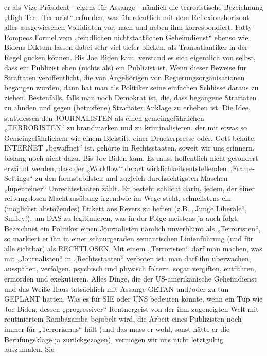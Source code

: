 \begin{multicols}{2}
{er als Vize-Präsident - eigens für Assange - nämlich die
terroristische Bezeichnung „High-Tech-Terrorist“ erfunden, was überdeutlich mit dem Reflexionshorizont aller
ausgewiesenen Vollidioten vor, nach und neben ihm
korrespondiert.\textCR
Fatty Pompeos Formel vom „feindlichen nichtstaatlichen Geheimdienst“ ebenso wie Bidens Diktum lassen
dabei sehr viel tiefer blicken, als Transatlantiker in der
Regel gucken können. Bis Joe Biden kam, verstand es
sich eigentlich von selbst, dass ein Publizist eben (nichts
als) ein Publizist ist. Wenn dieser Beweise für Straftaten
veröffentlicht, die von Angehörigen von Regierungsorganisationen begangen wurden, dann hat man als Politiker
seine einfachen Schlüsse daraus zu ziehen. Bestenfalls,
falls man noch Demokrat ist, die, dass begangene Straftaten zu ahnden und gegen (betroffene) Straftäter Anklage zu erheben ist. Die Idee, stattdessen den JOURNALISTEN als einen gemeingefährlichen „TERRORISTEN“
zu brandmarken und zu kriminalisieren, der mit etwas
so Gemeingefährlichem wie einem Bleistift, einer Druckerpresse oder, Gott behüte, INTERNET „bewaffnet“
ist, gehörte in Rechtsstaaten, soweit wir uns erinnern,
bislang noch nicht dazu. Bis Joe Biden kam.\textCR
Es muss hoffentlich nicht gesondert erwähnt werden,
dass der „Workflow“ derart wirklichkeitsentstellenden
„Frame-Settings“ zu den formstabilsten und zugleich
durchsichtigsten Maschen „lupenreiner“ Unrechtsstaaten zählt. Er besteht schlicht darin, jedem, der einer reibungslosen Machtausübung irgendwie im Wege steht,
schnellstens ein (möglichst abstoßendes) Etikett ans Revers zu heften (z.B. „Junge Liberale“, Smiley!), um DAS
zu legitimieren, was in der Folge meistens ja auch folgt.
Bezeichnet ein Politiker einen Journalisten nämlich unverblümt als „Terroristen“, so markiert er ihn in einer
schnurgeraden semantischen Linienführung (und für
alle sichtbar) als RECHTLOSEN. Mit einem „Terroristen“
darf man machen, was mit „Journalisten“ in „Rechtsstaaten“ verboten ist: man darf ihn überwachen, ausspähen,
verfolgen, psychisch und physisch foltern, sogar vergiften, entführen, ermorden und exekutieren. Alles Dinge,
die der US-amerikanische Geheimdienst und das Weiße
Haus tatsächlich mit Assange GETAN und/oder zu tun
GEPLANT hatten.\textCR
Was es für SIE oder UNS bedeuten könnte, wenn ein
Tüp wie Joe Biden, dessen „progressiver“ Rentnergeist
von der ihm zugeneigten Welt mit routiniertem Rambazamba bejubelt wird, die Arbeit eines Publizisten noch
immer für „Terrorismus“ hält (und das muss er wohl,
sonst hätte er die Berufungsklage ja zurückgezogen),
vermögen wir uns nicht letztgültig auszumalen. Sie
}
\end{multicols}
